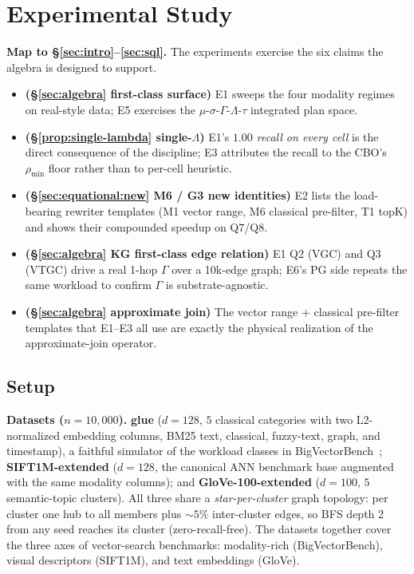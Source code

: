 \documentclass[sigconf]{acmart}
\theoremstyle{plain}
\theoremstyle{definition}
\theoremstyle{remark}
\begin{document}
\section{Experimental Study}\label{sec:discuss}

\noindent\textbf{Map to §\ref{sec:intro}--\ref{sec:sql}.}
The experiments exercise the six claims the algebra is
designed to support.

\begin{itemize}[leftmargin=*, itemsep=2pt]
\item \textbf{(§\ref{sec:algebra} first-class surface)} E1
sweeps the four modality regimes on real-style data; E5
exercises the $\mu$-$\sigma$-$\Gamma$-$\Lambda$-$\tau$
integrated plan space.
\item \textbf{(§\ref{prop:single-lambda} single-$\Lambda$)}
E1's \emph{$1.00$ recall on every cell} is the direct
consequence of the discipline; E3 attributes the recall to
the CBO's $\rho_{\min}$ floor rather than to per-cell
heuristic.
\item \textbf{(§\ref{sec:equational:new} M6 / G3 new
identities)} E2 lists the load-bearing rewriter templates
(M1 vector range, M6 classical pre-filter, T1 topK) and shows
their compounded speedup on Q7/Q8.
\item \textbf{(§\ref{sec:algebra} KG first-class edge
relation)} E1 Q2 (VGC) and Q3 (VTGC) drive a real 1-hop
$\Gamma$ over a 10k-edge graph; E6's PG side repeats the
same workload to confirm $\Gamma$ is substrate-agnostic.
\item \textbf{(§\ref{sec:algebra} approximate join)} The
vector range + classical pre-filter templates that E1--E3
all use are exactly the physical realization of the
approximate-join operator.
\end{itemize}

\subsection{Setup}

\textbf{Datasets ($n=10{,}000$).}
\textbf{glue} ($d=128$, $5$ classical categories with two
L2-normalized embedding columns, BM25 text, classical,
fuzzy-text, graph, and timestamp), a faithful simulator of the
workload classes in BigVectorBench~\cite{bigvectorbench2025};
\textbf{SIFT1M-extended} ($d=128$, the canonical ANN benchmark
base augmented with the same modality columns); and
\textbf{GloVe-100-extended} ($d=100$, $5$ semantic-topic
clusters). All three share a \emph{star-per-cluster} graph
topology: per cluster one hub to all members plus $\sim 5\%$
inter-cluster edges, so BFS depth 2 from any seed reaches its
cluster (zero-recall-free). The datasets together cover the
three axes of vector-search benchmarks: modality-rich
(BigVectorBench), visual descriptors (SIFT1M), and text
embeddings (GloVe).
\end{document}

